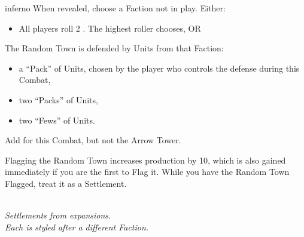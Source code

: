 \begin{multicols}{2}
\begin{expansion}[before=\vspace*{-11mm}]{inferno}
  \medskip
  When revealed, choose a Faction not in play. Either:
  \begin{itemize}
    \item All players roll 2 .
      The highest roller chooses, OR
  \end{itemize}

  The Random Town is defended by Units from that Faction:
  \begin{itemize}
    \item a ``Pack'' of  Units, chosen by the player who controls the defense during this Combat,
    \item two ``Packs'' of  Units,
    \item two ``Fews'' of  Units.
  \end{itemize}
  Add  for this Combat, but not the Arrow Tower.
  \medskip

  Flagging the Random Town increases  production by 10, which is also gained immediately if you are the first to Flag it.
  While you have the Random Town Flagged, treat it as a Settlement.
\end{expansion}

\end{multicols}

\vfill
\begin{center}
  \\
  \textit{Settlements from expansions.\\
     Each is styled after a different Faction.
   }
\end{center}
\pagebreak

\subsection*{}

